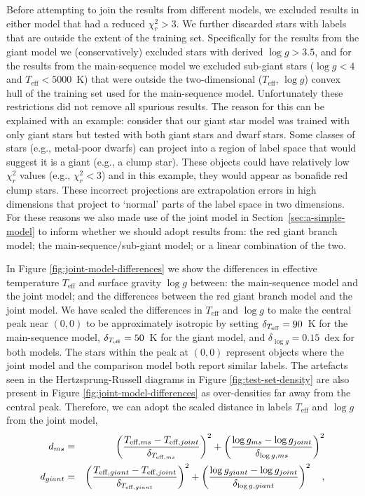 \documentclass[preprint,trackchanges]{aastex}
\newcommand{\teff}{T_{\mathrm{eff}}}
\newcommand{\logg}{\log g}
\begin{document}
Before attempting to join the results from different models, we excluded results
in either model that had a reduced $\chi_{r}^2 > 3$.  We further discarded stars with
labels that are outside the extent of the training set.  Specifically for the
results from the giant model we (conservatively) excluded stars with derived 
$\logg > 3.5$, and for the results from the main-sequence model we excluded 
sub-giant stars ($\logg < 4$ and $\teff < 5000$~K) that were outside the 
two-dimensional ($\teff$, $\logg$) convex hull of the training set used for the main-sequence model.  Unfortunately these restrictions did not remove all spurious
results.  The reason for this can be explained with an example:  consider that our 
giant star model was trained with only giant stars but tested with both giant 
stars and dwarf stars.  Some classes of stars (e.g., metal-poor dwarfs) can 
project into a region of label space that would suggest it is a giant 
(e.g., a clump star).  These objects could have relatively low $\chi_{r}^2$ values
(e.g., $\chi_{r}^2 < 3$) and in this example, they would appear as bonafide red clump 
stars.  These incorrect projections are extrapolation errors in high dimensions that
project to `normal' parts of the label space in two dimensions.  For these reasons 
we also made use of the joint model in Section~\ref{sec:a-simple-model}
to inform whether we should adopt results from: the red giant branch model; the
main-sequence/sub-giant model; or a linear combination of the two. 

In Figure \ref{fig:joint-model-differences} we show the differences in effective temperature
$\teff$ and surface gravity $\logg$ between: the main-sequence model and the joint
model; and the differences between the red giant branch model and the joint model. We have scaled
the differences in $\teff$ and $\logg$ to make the central peak near $(0, 0)$ to 
be approximately isotropic by setting
	$\delta_{T_{\rm eff}} = 90$~K for the main-sequence model, 
	$\delta_{T_{\rm eff}} = 50$~K for the giant model, and 
	$\delta_{\log{g}} = 0.15$~dex for both models.
The stars within the peak at $(0, 0)$ represent objects where
the joint model and the comparison model both report similar labels.  The artefacts 
seen in the Hertzsprung-Russell diagrams in Figure \ref{fig:test-set-density} are
also present in Figure \ref{fig:joint-model-differences} as over-densities far away
from the central peak.  Therefore, we can 
adopt the scaled distance in labels $\teff$ and $\logg$ from the joint model,
\begin{eqnarray}
	d_{ms} & = & \left(\frac{T_{{\rm eff},ms} - T_{{\rm eff},joint}}{\delta_{T_{{\rm eff},ms}}}\right)^2 + \left(\frac{\log{g}_{ms} - \log{g}_{joint}}{\delta_{\log{g},ms}}\right)^2   \nonumber \\
	d_{giant} & = & \left(\frac{T_{{\rm eff},giant} - T_{{\rm eff},joint}}{\delta_{T_{{\rm eff},giant}}}\right)^2 + \left(\frac{\log{g}_{giant} - \log{g}_{joint}}{\delta_{\log{g},giant}}\right)^2   \quad ,
\end{eqnarray}
\end{document}
